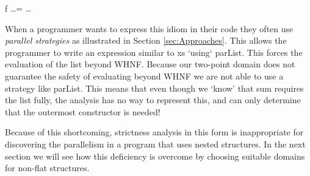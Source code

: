 \begin{haskell*}
f \dots = \dots {}
\end{haskell*}

When a programmer wants to express this idiom in their code they often use
\emph{parallel strategies} as illustrated in Section \ref{sec:Approaches}.
This allows the programmer to write an expression similar to \<xs `using`
parList\>. This forces the evaluation of the list beyond WHNF. Because our
two-point domain does not guarantee the safety of evaluating beyond WHNF we are
not able to use a strategy like \<parList\>. This means that even though we
`know' that \<sum\> requires the list fully, the analysis has no way to
represent this, and can only determine that the outermost constructor is
needed!

Because of this shortcoming, strictness analysis in this form is inappropriate
for discovering the parallelism in a program that uses nested structures. In
the next section we will see how this deficiency is overcome by choosing
suitable domains for non-flat structures.

%
